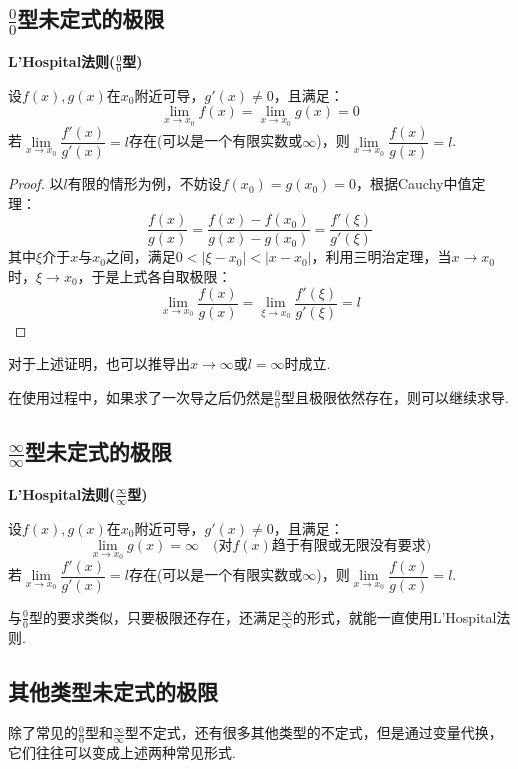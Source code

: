 \subsection{\texorpdfstring{$\frac{0}{0}$型未定式的极限}{0/0型未定式的极限}}
\begin{theorem}
    \textbf{L'Hospital法则($\frac{0}{0}$型)}

    设$f(x),g(x)$在$x_0$附近可导，$g'(x)\neq 0$，且满足：
    \[\lim_{x \to x_0} f(x) = \lim_{x \to x_0} g(x) = 0\]
    若$\lim\limits_{x \to x_0}\dfrac{f'(x)}{g'(x)}=l$存在(可以是一个有限实数或$\infty$)，则$\lim\limits_{x \to x_0}\dfrac{f(x)}{g(x)}=l$.
\end{theorem}

\begin{proof}
    以$l$有限的情形为例，不妨设$f(x_0) = g(x_0) = 0$，根据Cauchy中值定理：
    \[\frac{f(x)}{g(x)} = \frac{f(x)-f(x_0)}{g(x)-g(x_0)} = \frac{f'(\xi)}{g'(\xi)}\]
    其中$\xi$介于$x$与$x_0$之间，满足$0<|\xi-x_0|<|x-x_0|$，利用三明治定理，当$x\to x_0$时，$\xi \to x_0$，于是上式各自取极限：
    \[\lim_{x\to x_0}\frac{f(x)}{g(x)} = \lim_{\xi\to x_0}\frac{f'(\xi)}{g'(\xi)}=l\]
\end{proof}

对于上述证明，也可以推导出$x\to\infty$或$l=\infty$时成立.

在使用过程中，如果求了一次导之后仍然是$\frac{0}{0}$型且极限依然存在，则可以继续求导.


\subsection{\texorpdfstring{$\frac{\infty}{\infty}$型未定式的极限}{无穷/无穷型未定式的极限}}
\begin{theorem}
    \textbf{L'Hospital法则($\frac{\infty}{\infty}$型)}

    设$f(x),g(x)$在$x_0$附近可导，$g'(x)\neq 0$，且满足：
    \[\lim_{x \to x_0} g(x) = \infty \quad\text{(对$f(x)$趋于有限或无限没有要求)}\]
    若$\lim\limits_{x \to x_0}\dfrac{f'(x)}{g'(x)}=l$存在(可以是一个有限实数或$\infty$)，则$\lim\limits_{x \to x_0}\dfrac{f(x)}{g(x)}=l$.
\end{theorem}

与$\frac{0}{0}$型的要求类似，只要极限还存在，还满足$\frac{\infty}{\infty}$的形式，就能一直使用L'Hospital法则.


\subsection{其他类型未定式的极限}
除了常见的$\frac{0}{0}$型和$\frac{\infty}{\infty}$型不定式，还有很多其他类型的不定式，但是通过变量代换，它们往往可以变成上述两种常见形式.

